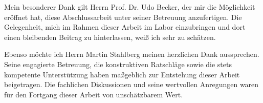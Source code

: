 Mein besonderer Dank gilt Herrn Prof. Dr. Udo Becker, der mir die Möglichkeit eröffnet hat, diese Abschlussarbeit unter seiner Betreuung anzufertigen. Die Gelegenheit, mich im Rahmen dieser Arbeit im Labor einzubringen und dort einen bleibenden Beitrag zu hinterlassen, weiß ich sehr zu schätzen.

Ebenso möchte ich Herrn Martin Stahlberg meinen herzlichen Dank aussprechen. Seine engagierte Betreuung, die konstruktiven Ratschläge sowie die stets kompetente Unterstützung haben maßgeblich zur Entstehung dieser Arbeit beigetragen. Die fachlichen Diskussionen und seine wertvollen Anregungen waren für den Fortgang dieser Arbeit von unschätzbarem Wert.






